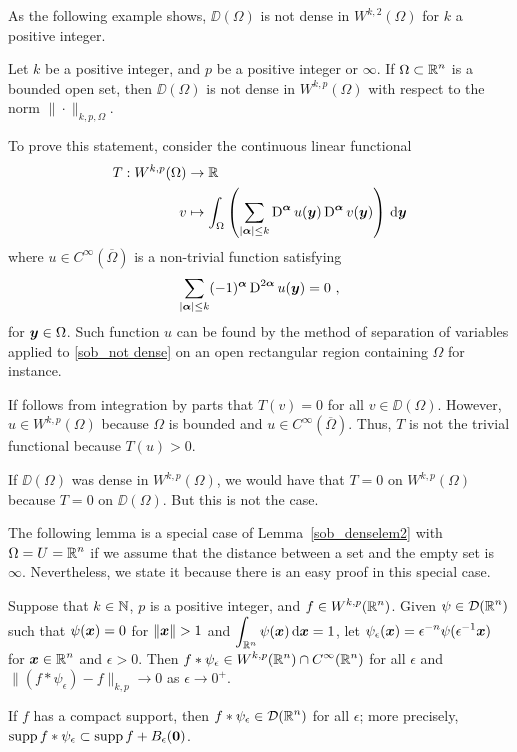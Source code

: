 As the following example shows, $\DD(\Omega)$ is not dense in
$\displaystyle W^{k,2}(\Omega)$ for $k$ a positive integer.

\begin{egg}
Let $k$ be a positive integer, and $p$ be a positive integer or $\infty$. 
If $\displaystyle \Omega \subset \mathbb{R}^n$ is a bounded open set, then
$\DD(\Omega)$ is not dense in $\displaystyle W^{k,p}(\Omega)$ with
respect to the norm $\|\cdot\|_{k,p,\Omega}$.

To prove this statement, consider the continuous linear functional
\begin{align*}
T: W^{k,p}(\Omega) & \rightarrow \mathbb{R} \\
v &\mapsto \int_{\Omega} \left( \sum_{|{\bm{\alpha}}|\leq k}
\operatorname{D}^{{\bm{\alpha}}} u({\bm{y}})
\operatorname{D}^{{\bm{\alpha}}} v({\bm{y}})\right) \,\mathrm{d}{{\bm{y}}}
\end{align*}
where $\displaystyle u \in C^\infty(\overline{\Omega})$ is a
non-trivial function satisfying
\begin{equation} \label{sob_not dense}
\sum_{|{\bm{\alpha}}|\leq k} (-1)^{{\bm{\alpha}}} \operatorname{D}^{2{\bm{\alpha}}}
u({\bm{y}}) = 0 \ ,
\end{equation}
for ${\bm{y}} \in \Omega$.  Such function $u$ can be found by the
method of separation of variables applied to \ref{sob_not dense} on an
open rectangular region containing $\Omega$ for instance.

If follows from integration by parts that
$\displaystyle T(v)=0$ for all $v\in \DD(\Omega)$.
However, $\displaystyle u \in W^{k,p}(\Omega)$ because $\Omega$ is bounded and
$\displaystyle u \in C^\infty(\overline{\Omega})$.  Thus,
$T$ is not the trivial functional because $T(u) >0$.

If $\DD(\Omega)$ was dense in $\displaystyle W^{k,p}(\Omega)$, we
would have that $T=0$ on $\displaystyle W^{k,p}(\Omega)$ because $T=0$ on
$\DD(\Omega)$.  But this is not the case.
\end{egg}

The following lemma is a special case of Lemma~\ref{sob_denselem2}
with $\displaystyle \Omega = U = \mathbb{R}^n$ if we assume that the distance
between a set and the empty set is $\infty$.  Nevertheless, we state
it because there is an easy proof in this special case.

\begin{lemma} \label{sob_denselem5}
Suppose that $k\in \mathbb{N}$, $p$ is a positive integer, and
$\displaystyle f \in W^{k,p}(\mathbb{R}^n)$.
Given $\displaystyle \psi \in \mathcal{D}(\mathbb{R}^n)$ such that
$\psi({\bm{x}}) = 0$ for $\|\VEC{x}\|>1$ and
$\displaystyle \int_{\mathbb{R}^n} \psi({\bm{x}})\,\mathrm{d}{{\bm{x}}} = 1$, let
$\displaystyle \psi_\epsilon({\bm{x}}) = \epsilon^{-n} \psi(\epsilon^{-1}{\bm{x}})$
for $\displaystyle {\bm{x}} \in \mathbb{R}^n$ and $\epsilon > 0$.
Then
$\displaystyle f\ast \psi_{\epsilon} \in W^{k,p}(\mathbb{R}^n) \cap C^\infty(\mathbb{R}^n)$
for all
$\epsilon$ and $\displaystyle \| \left( f \ast \psi_{\epsilon} \right)
- f\|_{k,p} \rightarrow 0$ as $\epsilon \rightarrow 0^+$.

If $f$ has a compact support, then
$\displaystyle f \ast \psi_{\epsilon} \in \mathcal{D}(\mathbb{R}^n)$ for all $\epsilon$;
more precisely,
$\operatorname{supp} f\ast \psi_\epsilon \subset \operatorname{supp} f + B_\epsilon({\bm{0}})$.
\end{lemma}

